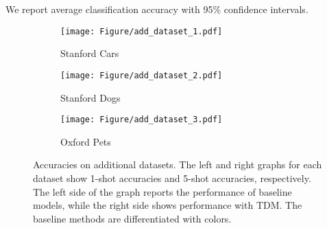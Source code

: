 We report average classification accuracy with 95\% confidence intervals.
\begin{figure*}
    \centering
    \begin{subfigure}[b]{0.33\textwidth}
        \centering
        \texttt{[image: Figure/add\_dataset\_1.pdf]}
        \caption{Stanford Cars}
        \vspace{-0.3cm}
        \label{fig:y equals x}
    \end{subfigure}
    \hfill
    \begin{subfigure}[b]{0.33\textwidth}
        \centering
        \texttt{[image: Figure/add\_dataset\_2.pdf]}
        \caption{Stanford Dogs}
        \vspace{-0.3cm}
        \label{fig:three sin x}
    \end{subfigure}
    \hfill
        \begin{subfigure}[b]{0.33\textwidth}
        \centering
        \texttt{[image: Figure/add\_dataset\_3.pdf]}
        \caption{Oxford Pets}
        \vspace{-0.3cm}
        \label{fig:three sin x}
    \end{subfigure}
    \caption{
    Accuracies on additional datasets. 
    The left and right graphs for each dataset show 1-shot accuracies and 5-shot accuracies, respectively.
    The left side of the graph reports the performance of baseline models, while the right side shows performance with TDM. The baseline methods are differentiated with colors.
    }
    \label{fig:additional_dataset}
    \vspace{-0.4cm}
\end{figure*}
%
 
